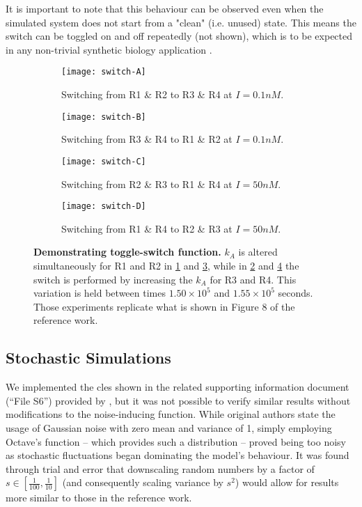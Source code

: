     It is important to note that this behaviour can be observed even when the simulated system does not start from a "clean" (i.e. unused) state.
    This means the switch can be toggled on and off repeatedly (not shown), which is to be expected in any non-trivial synthetic biology application \cite{reconfgate}.

    \begin{figure}[!htb]
      \centering
      \begin{subfigure}[t]{0.48\textwidth}
        \centering
        \texttt{[image: switch-A]}
        \caption{Switching from R1 \& R2 to R3 \& R4 at $I = 0.1 nM$.}
        \label{fig:switch-A}
      \end{subfigure}
      \hfill
      \begin{subfigure}[t]{0.48\textwidth}
        \centering
        \texttt{[image: switch-B]}
        \caption{Switching from R3 \& R4 to R1 \& R2 at $I = 0.1 nM$.}
        \label{fig:switch-B}
      \end{subfigure}
      \medskip
      \begin{subfigure}[t]{0.48\textwidth}
        \centering
        \texttt{[image: switch-C]}
        \caption{Switching from R2 \& R3 to R1 \& R4 at $I = 50 nM$.}
        \label{fig:switch-C}
      \end{subfigure}
      \hfill
      \begin{subfigure}[t]{0.48\textwidth}
        \centering
        \texttt{[image: switch-D]}
        \caption{Switching from R1 \& R4 to R2 \& R3 at $I = 50 nM$.}
        \label{fig:switch-D}
      \end{subfigure}
      \caption{\textbf{Demonstrating toggle-switch function.} $k_A$ is altered simultaneously for R1 and R2 in \ref{fig:switch-A} and \ref{fig:switch-C}, while in \ref{fig:switch-B} and \ref{fig:switch-D} the switch is performed by increasing the $k_A$ for R3 and R4. This variation is held between times $1.50 \times 10^5$ and $1.55 \times 10^5$ seconds. Those experiments replicate what is shown in Figure 8 of the reference work.}
      \label{fig:switch}
    \end{figure}


  \subsection{Stochastic Simulations}

    We implemented the \ac{cles} shown in the related supporting information document (``File S6'') provided by \citet{multif}, but it was not possible to verify similar results without modifications to the noise-inducing function.
    While original authors state the usage of Gaussian noise with zero mean and variance of 1, simply employing Octave's  function -- which provides such a distribution \cite{randn} -- proved being too noisy as stochastic fluctuations began dominating the model's behaviour.
    It was found through trial and error that downscaling random numbers by a factor of $s \in [\frac{1}{100}, \frac{1}{10}]$ (and consequently scaling variance by $s^2$) would allow for results more similar to those in the reference work.

